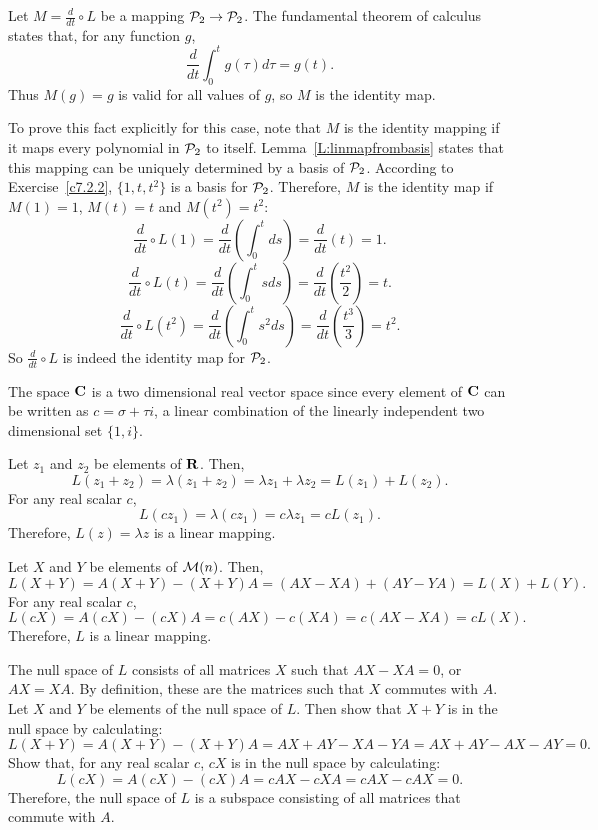 Let $M = \frac{d}{dt} \circ L$ be a mapping ${\cal P}_2
\rightarrow {\cal P}_2$.  The fundamental
theorem of calculus states that, for any function $g$,
\[ \frac{d}{dt}\int_0^t g(\tau)d\tau = g(t). \]
Thus $M(g) = g$ is valid for all values of $g$, so $M$ is the
identity map.

\para To prove this fact explicitly for this case, note that $M$ is
the identity mapping if it maps every polynomial in ${\cal P}_2$ to
itself.  Lemma~\ref{L:linmapfrombasis} states that this mapping can
be uniquely determined by a basis of ${\cal P}_2$.  According to
Exercise~\ref{c7.2.2}, $\{1,t,t^2\}$ is a basis for ${\cal P}_2$. 
Therefore, $M$ is the identity map if $M(1) = 1$, $M(t) = t$ and
$M(t^2) = t^2$:
\[ \frac{d}{dt} \circ L (1) = \frac{d}{dt}\left(\int_0^tds\right) =
\frac{d}{dt}(t) = 1. \]
\[ \frac{d}{dt} \circ L (t) = \frac{d}{dt}\left(\int_0^tsds\right) =
\frac{d}{dt}\left(\frac{t^2}{2}\right) = t. \]
\[ \frac{d}{dt} \circ L (t^2) = \frac{d}{dt}\left(\int_0^ts^2ds\right) =
\frac{d}{dt}\left(\frac{t^3}{3}\right) = t^2. \]
So $\frac{d}{dt} \circ L$ is indeed the identity map for ${\cal P}_2$.

The space $\mbox{$\bf{C}$}$ is a two dimensional real vector space since every
element of $\mbox{$\bf{C}$}$ can be written as $c = \sigma + \tau i$, a linear
combination of the linearly independent two dimensional set $\{1,i\}$.

\para Let $z_1$ and $z_2$ be elements of $\mbox{$\bf{R}$}$.  Then,
\[ L(z_1 + z_2) = \lambda(z_1 + z_2) =
\lambda z_1 + \lambda z_2 = L(z_1) + L(z_2). \]
For any real scalar $c$,
\[ L(cz_1) = \lambda(cz_1) = 
c\lambda z_1 = cL(z_1). \]
Therefore, $L(z) = \lambda z$ is a linear mapping.

\newpage
{}
Let $X$ and $Y$ be elements of ${\cal M}(n)$.  Then,
\[ L(X + Y) = A(X + Y) - (X + Y)A = (AX - XA)
+ (AY - YA) = L(X) + L(Y). \]
For any real scalar $c$,
\[ L(cX) = A(cX) - (cX)A = c(AX) - c(XA) = c(AX - XA) = cL(X). \]
Therefore, $L$ is a linear mapping.

\para The null space of $L$ consists of all matrices $X$ such that
$AX - XA = 0$, or $AX = XA$.  By definition, these are the matrices
such that $X$ commutes with $A$.  Let $X$ and $Y$ be elements of
the null space of $L$.  Then show that $X + Y$ is in the null space
by calculating:
\[ L(X + Y) = A(X + Y) - (X + Y)A = AX + AY - XA - YA = AX + AY - AX
- AY = 0. \]
Show that, for any real scalar $c$, $cX$ is in the null space by
calculating:
\[ L(cX) = A(cX) - (cX)A = cAX - cXA = cAX - cAX = 0. \]
Therefore, the null space of $L$ is a subspace consisting of all
matrices that commute with $A$.

